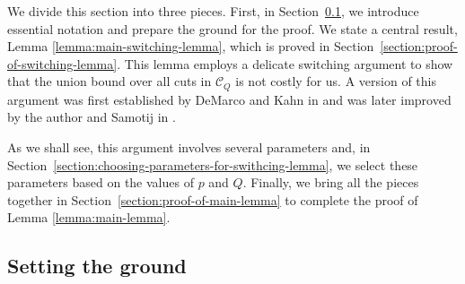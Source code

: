 \documentclass[11pt,a4paper,oneside,reqno]{amsart}
\newcommand{\cC}{\mathcal{C}}
\newcommand{\cF}{\mathcal{F}}
\newcommand{\cQ}{\mathcal{Q}}
\newcommand{\1}{\mathbbm{1}} %
\renewcommand{\le}{\leqslant}
\renewcommand{\ge}{\geqslant}
\newcommand{\cQL}{\cQ^{\mathrm{low}}}
\newcommand{\cQH}{\cQ^{\mathrm{high}}}
\newcommand{\cFQL}{\cF_Q^{\mathrm{low}}}
\newcommand{\ext}{\mathrm{ext}}
\begin{document}
We divide this section into three pieces. First, in Section~\ref{subsection:setting-the-ground}, we introduce essential notation and prepare the ground for the proof. We state a central result, Lemma \ref{lemma:main-switching-lemma}, which is proved in Section~\ref{section:proof-of-switching-lemma}. This lemma employs a delicate switching argument to show that the union bound over all cuts in $\cC_Q$ is not costly for us. A version of this argument was first established by DeMarco and Kahn in \cite{DeMKah15Tur} and was later improved by the author and Samotij in \cite{hoshen2023simonovits}. 

As we shall see, this argument involves several parameters and, in Section~\ref{section:choosing-parameters-for-swithcing-lemma}, we select these parameters based on the values of $p$ and $Q$. Finally, we bring all the pieces together in Section~\ref{section:proof-of-main-lemma} to complete the proof of Lemma \ref{lemma:main-lemma}.

\subsection{Setting the ground}\label{subsection:setting-the-ground}
%
\end{document}
